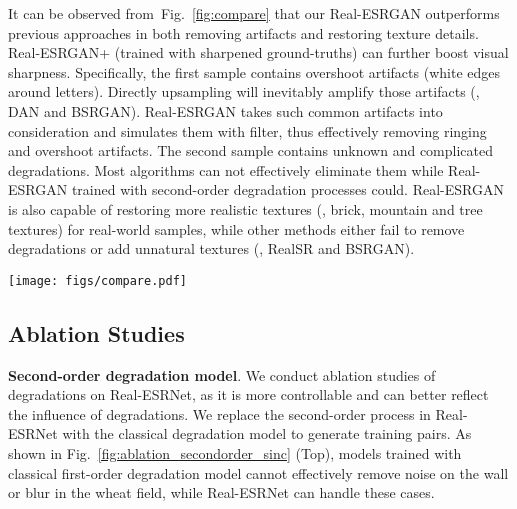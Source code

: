 \documentclass[10pt,twocolumn,letterpaper]{article}
\begin{document}
It can be observed from~Fig.~\ref{fig:compare} that our Real-ESRGAN outperforms previous approaches in both removing artifacts and restoring texture details. Real-ESRGAN+ (trained with sharpened ground-truths) can further boost visual sharpness.
Specifically, the first sample contains overshoot artifacts (white edges around letters). Directly upsampling will inevitably amplify those artifacts (\eg, DAN and BSRGAN). Real-ESRGAN takes such common artifacts into consideration and simulates them with  filter, thus effectively removing ringing and overshoot artifacts.
The second sample contains unknown and complicated degradations. Most algorithms can not effectively eliminate them while Real-ESRGAN trained with second-order degradation processes could.
Real-ESRGAN is also capable of restoring more realistic textures (\eg, brick, mountain and tree textures) for real-world samples, while other methods either fail to remove degradations or add unnatural textures (\eg, RealSR and BSRGAN).

\begin{figure*}
	\vspace{-0.2cm}
	\begin{center}
\texttt{[image: figs/compare.pdf]}
	\end{center}
	\vspace{-0.5cm}
	\caption{Qualitative comparisons on several representative real-world samples with upsampling scale factor of 4. Our \mbox{Real-ESRGAN} outperforms previous approaches in both removing artifacts and restoring texture details. Real-ESRGAN+ (trained with sharpened ground-truths) can further boost visual sharpness.
	Other methods may either fail to remove overshoot (the 1st sample) and complicated artifacts (the 2nd sample), or fail to restore realistic and natural textures for various scenes (the 3rd, 4th, 5th samples).
	(\textbf{Zoom in for best view})}
	\label{fig:compare}
\end{figure*}


\subsection{Ablation Studies}
\noindent\textbf{Second-order degradation model}.
We conduct ablation studies of degradations on Real-ESRNet, as it is more controllable and can better reflect the influence of degradations.
We replace the second-order process in Real-ESRNet with the classical degradation model to generate training pairs.
As shown in Fig.~\ref{fig:ablation_secondorder_sinc} (Top), models trained with classical first-order degradation model cannot effectively remove noise on the wall or blur in the wheat field, while Real-ESRNet can handle these cases.
\end{document}
